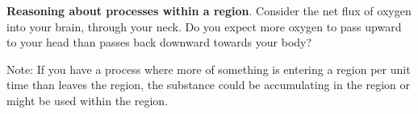 \documentclass[12pt,letterpaper,noanswers]{exam}
\begin{document}




\noindent\textbf{Reasoning about processes within a region}.  Consider the net flux of oxygen into your brain, through your neck.  Do you expect more oxygen to pass upward to your head than passes back downward towards your body?
\vspace{0.8in}

Note: If you have a process where more of something is entering a region per unit time than leaves the region, the substance could be accumulating in the region or might be used within the region.

\vspace{1cm}
\end{document}
